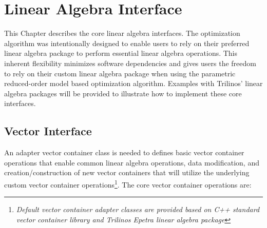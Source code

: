\chapter{Linear Algebra Interface}    

    This Chapter describes the core linear algebra interfaces. The optimization algorithm was intentionally designed to enable users to rely on their preferred linear algebra package to perform essential linear algebra operations. This inherent flexibility minimizes software dependencies and gives users the freedom to rely on their custom linear algebra package when using the parametric reduced-order model based optimization algorithm. Examples with Trilinos' linear algebra packages will be provided to illustrate how to implement these core interfaces.
    
    \section{Vector Interface}
    \label{sec:VecAPI}
    
    An adapter vector container class is needed to defines basic vector container operations that enable common linear algebra operations, data modification, and creation/construction of new vector containers that will utilize the underlying custom vector container operations\footnote{\emph{Default vector container adapter classes are provided based on C++ standard vector container library and Trilinos Epetra linear algebra package}}. The core vector container operations are:
    
